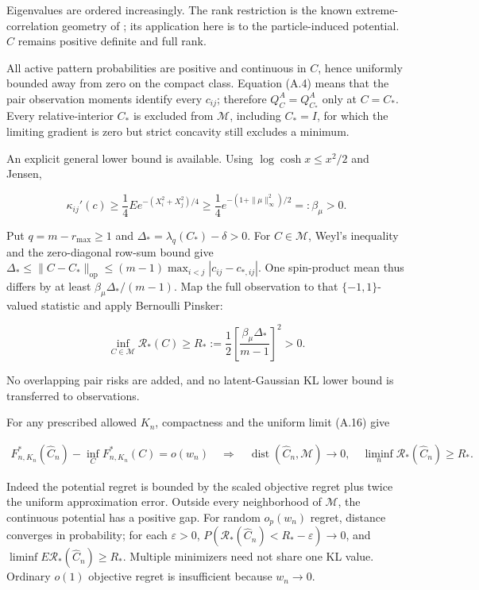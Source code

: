 \documentclass{article}
\begin{document}
Eigenvalues are ordered increasingly. The rank restriction is the known
extreme-correlation geometry of \citep{litam1994}; its application here
is to the particle-induced potential. \(C\) remains positive definite
and full rank.

All active pattern probabilities are positive and continuous in \(C\),
hence uniformly bounded away from zero on the compact class. Equation
(A.4) means that the pair observation moments identify every \(c_{ij}\);
therefore \(Q_C^A=Q_{C_*}^A\) only at \(C=C_*\). Every relative-interior
\(C_*\) is excluded from \(\mathcal M\), including \(C_*=I\), for which
the limiting gradient is zero but strict concavity still excludes a
minimum.


An explicit general lower bound is available. Using
\(\log\cosh x\le x^2/2\) and Jensen,

\[
\kappa_{ij}'(c)\ge\frac14
E e^{-(X_i^2+X_j^2)/4}
\ge\frac14e^{-(1+\|\mu\|_\infty^2)/2}
=:\beta_\mu>0 .
\tag{A.18}
\]

Put \(q=m-r_{\max}\ge1\) and \(\Delta_*=\lambda_q(C_*)-\delta>0\). For
\(C\in\mathcal M\), Weyl's inequality and the zero-diagonal row-sum
bound give
\(\Delta_*\le\|C-C_*\|_{\mathrm{op}}\le(m-1)\max_{i<j}|c_{ij}-c_{*,ij}|\).
One spin-product mean thus differs by at least
\(\beta_\mu\Delta_* /(m-1)\). Map the full observation to that
\(\{-1,1\}\)-valued statistic and apply Bernoulli Pinsker:

\[
\inf_{C\in\mathcal M}\mathcal R_*(C)
\ge R_*:=\frac12\left[\frac{\beta_\mu\Delta_*}{m-1}\right]^2>0 .
\tag{A.19}
\]

No overlapping pair risks are added, and no latent-Gaussian KL lower
bound is transferred to observations.

For any prescribed allowed \(K_n\), compactness and the uniform limit
(A.16) give

\[
\begin{gathered}
F_{n,K_n}^*(\widehat C_n)-\inf_C F_{n,K_n}^*(C)=o(w_n)
\quad\Longrightarrow\quad
\operatorname{dist}(\widehat C_n,\mathcal M)\to0,\quad
\liminf_n\mathcal R_*(\widehat C_n)\ge R_* .
\end{gathered}
\tag{A.20}
\]

Indeed the potential regret is bounded by the scaled objective regret
plus twice the uniform approximation error. Outside every neighborhood
of \(\mathcal M\), the continuous potential has a positive gap. For
random \(o_p(w_n)\) regret, distance converges in probability; for each
\(\varepsilon>0\),
\(P(\mathcal R_*(\widehat C_n)<R_*-\varepsilon)\to0\), and
\(\liminf E\mathcal R_*(\widehat C_n)\ge R_*\). Multiple minimizers need
not share one KL value. Ordinary \(o(1)\) objective regret is
insufficient because \(w_n\to0\).
\end{document}

